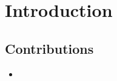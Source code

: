 \section{Introduction}

\subsection*{Contributions}

\begin{itemize}[leftmargin=*]
    \item   {}
\end{itemize}
